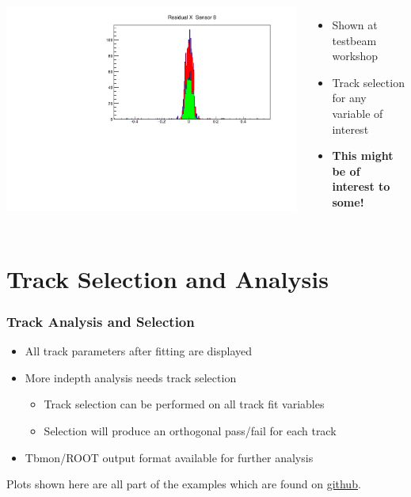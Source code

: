 \documentclass{beamer}
\begin{document}
\begin{frame}
\begin{columns}[t]
\includegraphics[width=1\linewidth]{pics/resXCut-5_5MicronErr.pdf}\\ 
\begin{itemize}
\item Shown at testbeam workshop
\item Track selection for any variable of interest
\item \textbf{This might be of interest to some!}
\end{itemize}
\end{columns}
\vspace{5pt}
\end{frame}



\section{Track Selection and Analysis}
\begin{frame}
\frametitle{Track Analysis and Selection}
\begin{itemize}
\item All track parameters after fitting are displayed
\item More indepth analysis needs track selection
\begin{itemize}
\item Track selection can be performed on all track fit variables 
\item Selection will produce an orthogonal pass/fail for each track
\end{itemize} 
\item Tbmon/ROOT output format available for further analysis 
\end{itemize}
\begin{myboxGreen}
Plots shown here are all part of the examples which are found on \href{https://github.com/AlexanderMorton/eutelescope/tree/prepareForMerge}{github}.
\end{myboxGreen}
\end{frame}
\end{document}
